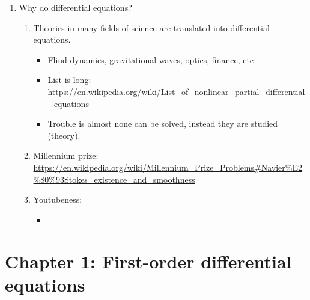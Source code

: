 \documentclass{article}
\begin{document}
\begin{enumerate}
\item Why do differential equations?
\begin{enumerate}
\item Theories in many fields of science are translated into differential equations.
\begin{itemize}
\item Fliud dynamics, gravitational waves, optics, finance, etc
\item List is long: \url{https://en.wikipedia.org/wiki/List_of_nonlinear_partial_differential_equations}
\item Trouble is almost none can be solved, instead they are studied (theory).
\end{itemize}
\item Millennium prize: \url{https://en.wikipedia.org/wiki/Millennium_Prize_Problems#Navier%E2%80%93Stokes_existence_and_smoothness}
\item Youtubeness:
\begin{itemize}
\item 
\end{itemize}
\end{enumerate}
\end{enumerate}


\section{Chapter 1: First-order differential equations}

\end{document}
